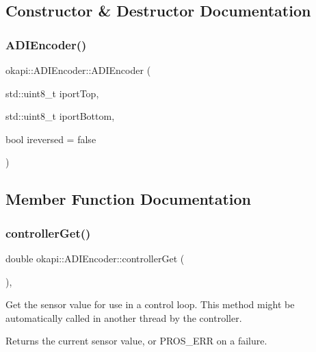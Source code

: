\subsection{Constructor \& Destructor Documentation}
\mbox{\label{classokapi_1_1ADIEncoder_ae60daf46ded27335225cc9b6522054c6}} 
\subsubsection{\texorpdfstring{ADIEncoder()}{ADIEncoder()}}
{\footnotesize\ttfamily okapi\+::\+A\+D\+I\+Encoder\+::\+A\+D\+I\+Encoder (\begin{DoxyParamCaption}\item[{std\+::uint8\+\_\+t}]{iport\+Top,  }\item[{std\+::uint8\+\_\+t}]{iport\+Bottom,  }\item[{bool}]{ireversed = {\ttfamily false} }\end{DoxyParamCaption})}



\subsection{Member Function Documentation}
\mbox{\label{classokapi_1_1ADIEncoder_a57358ad75caea8ddf829c40e9e42ab83}} 
\subsubsection{\texorpdfstring{controllerGet()}{controllerGet()}}
{\footnotesize\ttfamily double okapi\+::\+A\+D\+I\+Encoder\+::controller\+Get (\begin{DoxyParamCaption}{ }\end{DoxyParamCaption})\hspace{0.3cm}{\ttfamily [override]}, {\ttfamily [virtual]}}

Get the sensor value for use in a control loop. This method might be automatically called in another thread by the controller.

\begin{DoxyReturn}{Returns}
the current sensor value, or {\ttfamily P\+R\+O\+S\+\_\+\+E\+RR} on a failure. 
\end{DoxyReturn}


